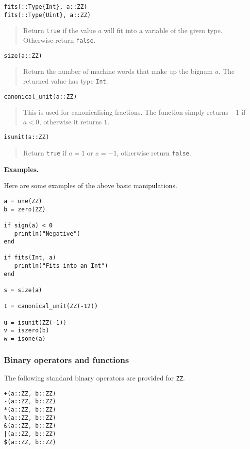 \documentclass[a4paper,10pt]{article}
\newcommand{\code}{\lstinline}
\newcommand{\desc}[1]{\vspace{-3mm}\begin{quote}#1\end{quote}}
\begin{document}
{\begin{lstlisting}
fits(::Type{Int}, a::ZZ)
fits(::Type{Uint}, a::ZZ)
\end{lstlisting}

\desc{Return \code{true} if the value $a$ will fit into a variable of the given
type. Otherwise return \code{false}.}

\begin{lstlisting}
size(a::ZZ)
\end{lstlisting}

\desc{Return the number of machine words that make up the bignum $a$. The
returned value has type \code{Int}.}

\begin{lstlisting}
canonical_unit(a::ZZ)
\end{lstlisting}

\desc{This is used for canonicalising fractions. The function simply returns $-1$
if $a < 0$, otherwise it returns $1$.}

\begin{lstlisting}
isunit(a::ZZ)
\end{lstlisting}

\desc{Return \code{true} if $a = 1$ or $a = -1$, otherwise return \code{false}.}

\textbf{Examples.}

Here are some examples of the above basic manipulations.

\begin{lstlisting}
a = one(ZZ)
b = zero(ZZ)

if sign(a) < 0
   println("Negative")
end

if fits(Int, a)
   println("Fits into an Int")
end

s = size(a)

t = canonical_unit(ZZ(-12))

u = isunit(ZZ(-1))
v = iszero(b)
w = isone(a)
\end{lstlisting}

\subsubsection{Binary operators and functions}

The following standard binary operators are provided for \code{ZZ}.

\begin{lstlisting}
+(a::ZZ, b::ZZ)
-(a::ZZ, b::ZZ)
*(a::ZZ, b::ZZ)
%(a::ZZ, b::ZZ)
&(a::ZZ, b::ZZ)
|(a::ZZ, b::ZZ)
$(a::ZZ, b::ZZ)
\end{lstlisting}

}
\end{document}
